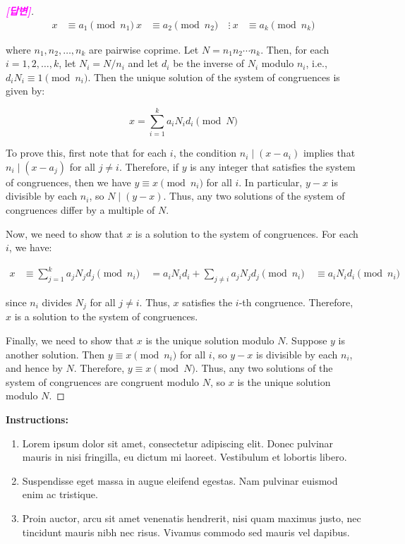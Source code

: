 \documentclass{article}
\begin{document}
\begin{itemize}
\begin{proof}[\normalfont\bf\textcolor{magenta}{[답변]}]
		\begin{align*}
			x &\equiv a_1 \pmod{n_1} \
			x &\equiv a_2 \pmod{n_2} \
			&\vdots \
			x &\equiv a_k \pmod{n_k}
		\end{align*}
		
		where $n_1, n_2, \dots, n_k$ are pairwise coprime. Let $N = n_1 n_2 \cdots n_k$. Then, for each $i = 1, 2, \dots, k$, let $N_i = N/n_i$ and let $d_i$ be the inverse of $N_i$ modulo $n_i$, i.e., $d_iN_i \equiv 1 \pmod{n_i}$. Then the unique solution of the system of congruences is given by:
		
		$$x = \sum_{i=1}^{k} a_i N_i d_i \pmod{N}$$
		
		To prove this, first note that for each $i$, the condition $n_i \mid (x-a_i)$ implies that $n_i \mid (x-a_j)$ for all $j \neq i$. Therefore, if $y$ is any integer that satisfies the system of congruences, then we have $y \equiv x \pmod{n_i}$ for all $i$. In particular, $y-x$ is divisible by each $n_i$, so $N \mid (y-x)$. Thus, any two solutions of the system of congruences differ by a multiple of $N$.
		
		Now, we need to show that $x$ is a solution to the system of congruences. For each $i$, we have:
		
		\begin{align*}
			x &\equiv \sum_{j=1}^{k} a_j N_j d_j \pmod{n_i} \
			&= a_i N_i d_i + \sum_{j \neq i} a_j N_j d_j \pmod{n_i} \
			&\equiv a_i N_i d_i \pmod{n_i} \
		\end{align*}
		
		since $n_i$ divides $N_j$ for all $j \neq i$. Thus, $x$ satisfies the $i$-th congruence. Therefore, $x$ is a solution to the system of congruences.
		
		Finally, we need to show that $x$ is the unique solution modulo $N$. Suppose $y$ is another solution. Then $y \equiv x \pmod{n_i}$ for all $i$, so $y-x$ is divisible by each $n_i$, and hence by $N$. Therefore, $y \equiv x \pmod{N}$. Thus, any two solutions of the system of congruences are congruent modulo $N$, so $x$ is the unique solution modulo $N$.
	\end{proof}
\end{itemize}

\noindent \textbf{Instructions:}
\begin{enumerate}[label=\alph*.]
	\item Lorem ipsum dolor sit amet, consectetur adipiscing elit. Donec pulvinar mauris in nisi fringilla, eu dictum mi laoreet. Vestibulum et lobortis libero.
	\item Suspendisse eget massa in augue eleifend egestas. Nam pulvinar euismod enim ac tristique.
	\item Proin auctor, arcu sit amet venenatis hendrerit, nisi quam maximus justo, nec tincidunt mauris nibh nec risus. Vivamus commodo sed mauris vel dapibus.
\end{enumerate}
\end{document}
